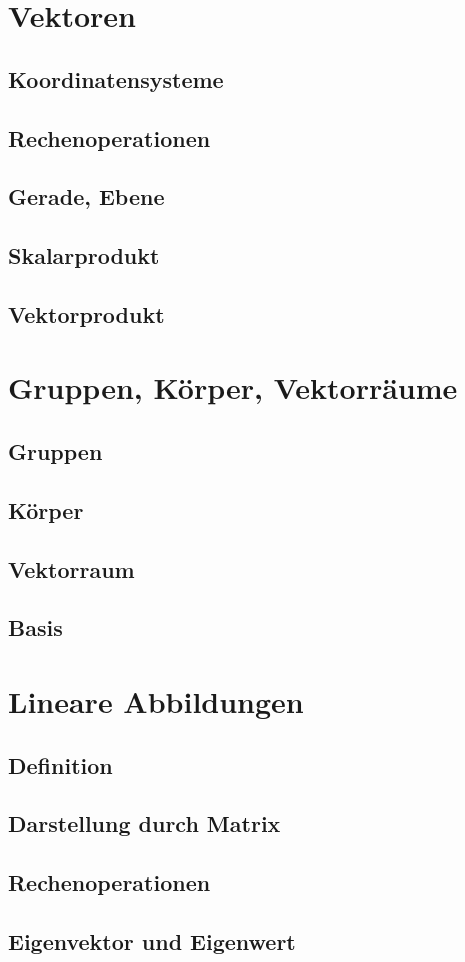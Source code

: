 \documentclass[a4paper,10pt]{scrartcl}
\begin{document}
    \section{Vektoren}
        \subsection{Koordinatensysteme}
        \subsection{Rechenoperationen}
        \subsection{Gerade, Ebene}
        \subsection{Skalarprodukt}
        \subsection{Vektorprodukt}
    
    \section{Gruppen, Körper, Vektorräume}
        \subsection{Gruppen}
        \subsection{Körper}
        \subsection{Vektorraum}
        \subsection{Basis}

    \section{Lineare Abbildungen}
        \subsection{Definition}
        \subsection{Darstellung durch Matrix}
        \subsection{Rechenoperationen}
        \subsection{Eigenvektor und Eigenwert}
    
\end{document}
